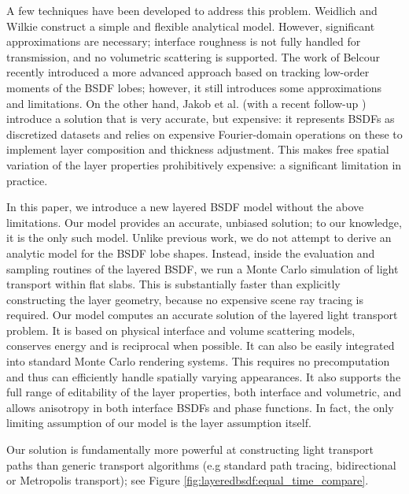 A few techniques have been developed to address this problem. Weidlich and Wilkie \cite{weidlich2007arbitrarily} construct a simple and flexible analytical model. However, significant approximations are necessary; interface roughness is not fully handled for transmission, and no volumetric scattering is supported. The work of Belcour \cite{belcour2018efficient} recently introduced a more advanced approach based on tracking low-order moments of the BSDF lobes; however, it still introduces some approximations and limitations. On the other hand, Jakob et al. \cite{jakob2014comprehensive} (with a recent follow-up \cite{zeltner2018layer}) introduce a solution that is very accurate, but expensive: it represents BSDFs as discretized datasets and relies on expensive Fourier-domain operations on these to implement layer composition and thickness adjustment. This makes free spatial variation of the layer properties prohibitively expensive: a significant limitation in practice.

In this paper, we introduce a new layered BSDF model without the above limitations. Our model provides an accurate, unbiased solution; to our knowledge, it is the only such model.
Unlike previous work, we do not attempt to derive an analytic model for the BSDF lobe shapes. Instead, inside the evaluation and sampling routines of the layered BSDF, we run a Monte Carlo simulation of light transport within flat slabs.
This is substantially faster than explicitly constructing the layer geometry, because no expensive scene ray tracing is required.
Our model computes an accurate solution of the layered light transport problem.
It is based on physical interface and volume scattering models, conserves energy and is reciprocal when possible. It can also be easily integrated into standard Monte Carlo rendering systems.
This requires no precomputation and thus can efficiently handle spatially varying appearances. It also supports the full range of editability of the layer properties, both interface and volumetric, and allows anisotropy in both interface BSDFs and phase functions. In fact, the only limiting assumption of our model is the layer assumption itself.

Our solution is fundamentally more powerful at constructing light transport paths than generic transport algorithms (e.g standard path tracing, bidirectional or Metropolis transport); see Figure \ref{fig:layeredbsdf:equal_time_compare}. 


